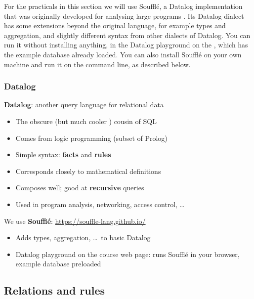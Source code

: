For the practicals in this section we will use Soufflé, a Datalog implementation that was originally developed for analysing large programs \citep{Jordan2016}.
Its Datalog dialect has some extensions beyond the original language, for example types and aggregation, and slightly different syntax from other dialects of Datalog.
You can run it without installing anything, in the Datalog playground on the \materialspage{}, which has the example database already loaded.
You can also install Soufflé on your own machine and run it on the command line, as described below.

\begin{frame}
    \label{s:datalog-intro}
    \frametitle{Datalog}
    \textbf{Datalog}: another query language for relational data
    \begin{itemize}
        \item The obscure (but much cooler \emojisunglasses{}) cousin of SQL
        \item Comes from logic programming (subset of Prolog)
        \item Simple syntax: \textbf{facts} and \textbf{rules}
        \item Corresponds closely to mathematical definitions
        \item Composes well; good at \textbf{recursive} queries
        \item Used in program analysis, networking, access control, \dots\\[1em]\pause
    \end{itemize}
    We use \textbf{Soufflé}: \url{https://souffle-lang.github.io/}
    \begin{itemize}
        \item Adds types, aggregation, \dots\ to basic Datalog
        \item Datalog playground on the course web page: runs Soufflé in your browser, example database preloaded
    \end{itemize}
\end{frame}
\label{l:datalog-intro}

\subsection{Relations and rules}\label{sec:datalog-rules}

